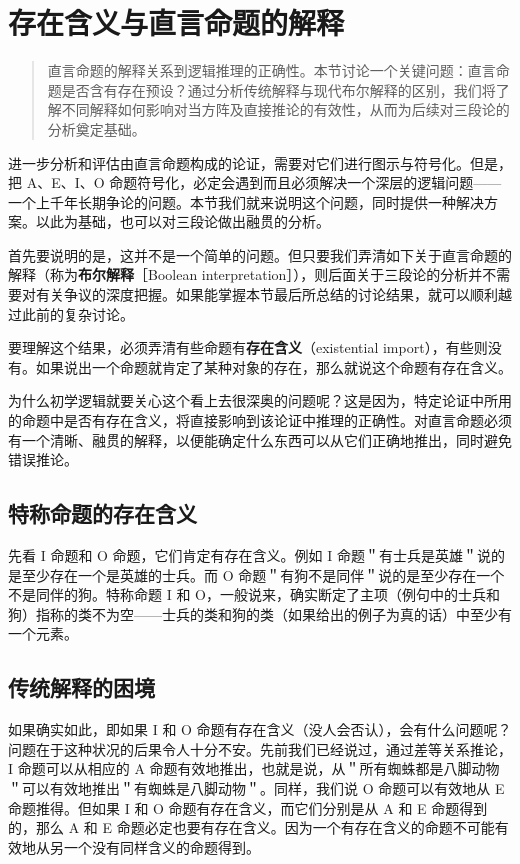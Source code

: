 \section{存在含义与直言命题的解释}

\begin{quotation}
直言命题的解释关系到逻辑推理的正确性。本节讨论一个关键问题：直言命题是否含有存在预设？通过分析传统解释与现代布尔解释的区别，我们将了解不同解释如何影响对当方阵及直接推论的有效性，从而为后续对三段论的分析奠定基础。
\end{quotation}

进一步分析和评估由直言命题构成的论证，需要对它们进行图示与符号化。但是，把 A、E、I、O 命题符号化，必定会遇到而且必须解决一个深层的逻辑问题——一个上千年长期争论的问题。本节我们就来说明这个问题，同时提供一种解决方案。以此为基础，也可以对三段论做出融贯的分析。

首先要说明的是，这并不是一个简单的问题。但只要我们弄清如下关于直言命题的解释（称为\textbf{布尔解释}［Boolean interpretation］），则后面关于三段论的分析并不需要对有关争议的深度把握。如果能掌握本节最后所总结的讨论结果，就可以顺利越过此前的复杂讨论。

要理解这个结果，必须弄清有些命题有\textbf{存在含义}（existential import），有些则没有。如果说出一个命题就肯定了某种对象的存在，那么就说这个命题有存在含义。

为什么初学逻辑就要关心这个看上去很深奥的问题呢？这是因为，特定论证中所用的命题中是否有存在含义，将直接影响到该论证中推理的正确性。对直言命题必须有一个清晰、融贯的解释，以便能确定什么东西可以从它们正确地推出，同时避免错误推论。

\subsection{特称命题的存在含义}

先看 I 命题和 O 命题，它们肯定有存在含义。例如 I 命题＂有士兵是英雄＂说的是至少存在一个是英雄的士兵。而 O 命题＂有狗不是同伴＂说的是至少存在一个不是同伴的狗。特称命题 I 和 O，一般说来，确实断定了主项（例句中的士兵和狗）指称的类不为空——士兵的类和狗的类（如果给出的例子为真的话）中至少有一个元素。\cite{russell1905}

\subsection{传统解释的困境}

如果确实如此，即如果 I 和 O 命题有存在含义（没人会否认），会有什么问题呢？问题在于这种状况的后果令人十分不安。先前我们已经说过，通过差等关系推论，I 命题可以从相应的 A 命题有效地推出，也就是说，从＂所有蜘蛛都是八脚动物＂可以有效地推出＂有蜘蛛是八脚动物＂。同样，我们说 O 命题可以有效地从 E 命题推得。但如果 I 和 O 命题有存在含义，而它们分别是从 A 和 E 命题得到的，那么 A 和 E 命题必定也要有存在含义。因为一个有存在含义的命题不可能有效地从另一个没有同样含义的命题得到。\cite{russell1905}


